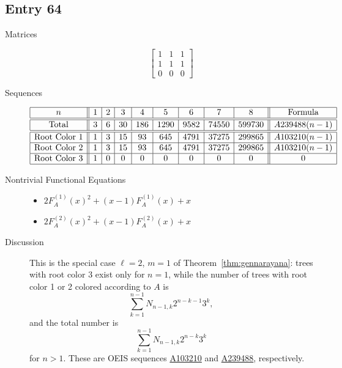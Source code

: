 \documentclass[12pt]{amsart}
\newcommand{\seqnum}[1]{\href{https://oeis.org/#1}{#1}}
\newcommand{\gff}[2]{F_{#2}^{(#1)}(x)}
\newcommand{\gfa}[1]{\gff{#1}{A}}
\begin{document}
\subsection*{Entry 64}
\begin{description}
    \item[Matrices]
    
    \[\begin{bmatrix}
1 & 1 & 1 \\
1 & 1 & 1 \\
0 & 0 & 0
\end{bmatrix}\]
    \item[Sequences]\hspace*{\fill}\vspace{-0.5cm}
    \begin{center}
        \[
        \begin{array}{|c||c|c|c|c|c|c|c|c||c|}\hline
           n  & 1 & 2 & 3 & 4 & 5 & 6 & 7 & 8  & \text{Formula}\\\hline\hline
           \text{Total}  & 3 & 6 & 30 & 186 & 1290 & 9582 & 74550 & 599730 & A239488(n-1)
           \\\hline\hline
           \text{Root Color }1 & 1 & 3 & 15 & 93 & 645 & 4791 & 37275 & 299865 & A103210(n-1)\\\hline
           \text{Root Color }2 & 1 & 3 & 15 & 93 & 645 & 4791 & 37275 & 299865 & A103210(n-1)\\\hline
           \text{Root Color }3 & 1 & 0 & 0 & 0 & 0 & 0 & 0 & 0 & 0\\\hline
        \end{array}
        \]
    \end{center}
    
    \item[Nontrivial Functional Equations]\hspace*{\fill}

    \begin{itemize}
\item $2\gfa{1}^2+(x - 1)\gfa{1}+x$


\item $2\gfa{2}^2+(x - 1)\gfa{2}+x$

\end{itemize}
    \item[Discussion] 
This is the special case $\ell=2$, $m=1$ of Theorem~\ref{thm:gennarayana}: trees with root color 3 exist only for $n=1$, while the number of trees with root color 1 or 2 colored according to $A$ is
$$\sum_{k=1}^{n-1} N_{n-1,k} 2^{n-k-1}3^k,$$
and the total number is
$$\sum_{k=1}^{n-1} N_{n-1,k} 2^{n-k}3^k$$
for $n > 1$. These are OEIS sequences \seqnum{A103210} and \seqnum{A239488}, respectively.
    

\end{description}
\end{document}
